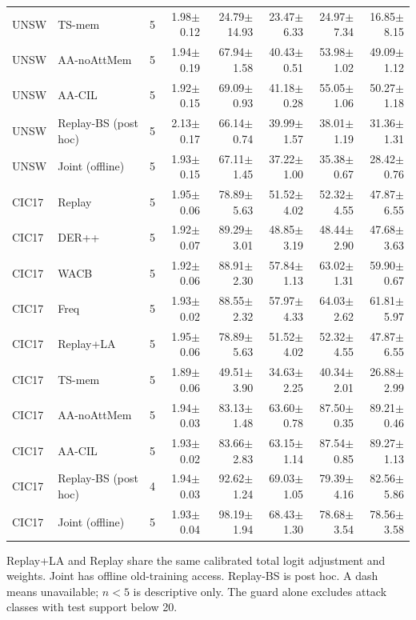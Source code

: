 \begin{table}[t]
\begin{tabular}{llrrrrrr}
UNSW & TS-mem & 5 & 1.98$\pm$0.12 & 24.79$\pm$14.93 & 23.47$\pm$6.33 & 24.97$\pm$7.34 & 16.85$\pm$8.15 \\
UNSW & AA-noAttMem & 5 & 1.94$\pm$0.19 & 67.94$\pm$1.58 & 40.43$\pm$0.51 & 53.98$\pm$1.02 & 49.09$\pm$1.12 \\
UNSW & AA-CIL & 5 & 1.92$\pm$0.15 & 69.09$\pm$0.93 & 41.18$\pm$0.28 & 55.05$\pm$1.06 & 50.27$\pm$1.18 \\
UNSW & Replay-BS (post hoc) & 5 & 2.13$\pm$0.17 & 66.14$\pm$0.74 & 39.99$\pm$1.57 & 38.01$\pm$1.19 & 31.36$\pm$1.31 \\
UNSW & Joint (offline) & 5 & 1.93$\pm$0.15 & 67.11$\pm$1.45 & 37.22$\pm$1.00 & 35.38$\pm$0.67 & 28.42$\pm$0.76 \\
CIC17 & Replay & 5 & 1.95$\pm$0.06 & 78.89$\pm$5.63 & 51.52$\pm$4.02 & 52.32$\pm$4.55 & 47.87$\pm$6.55 \\
CIC17 & DER++ & 5 & 1.92$\pm$0.07 & 89.29$\pm$3.01 & 48.85$\pm$3.19 & 48.44$\pm$2.90 & 47.68$\pm$3.63 \\
CIC17 & WACB & 5 & 1.92$\pm$0.06 & 88.91$\pm$2.30 & 57.84$\pm$1.13 & 63.02$\pm$1.31 & 59.90$\pm$0.67 \\
CIC17 & Freq & 5 & 1.93$\pm$0.02 & 88.55$\pm$2.32 & 57.97$\pm$4.33 & 64.03$\pm$2.62 & 61.81$\pm$5.97 \\
CIC17 & Replay+LA & 5 & 1.95$\pm$0.06 & 78.89$\pm$5.63 & 51.52$\pm$4.02 & 52.32$\pm$4.55 & 47.87$\pm$6.55 \\
CIC17 & TS-mem & 5 & 1.89$\pm$0.06 & 49.51$\pm$3.90 & 34.63$\pm$2.25 & 40.34$\pm$2.01 & 26.88$\pm$2.99 \\
CIC17 & AA-noAttMem & 5 & 1.94$\pm$0.03 & 83.13$\pm$1.48 & 63.60$\pm$0.78 & 87.50$\pm$0.35 & 89.21$\pm$0.46 \\
CIC17 & AA-CIL & 5 & 1.93$\pm$0.02 & 83.66$\pm$2.83 & 63.15$\pm$1.14 & 87.54$\pm$0.85 & 89.27$\pm$1.13 \\
CIC17 & Replay-BS (post hoc) & 4 & 1.94$\pm$0.03 & 92.62$\pm$1.24 & 69.03$\pm$1.05 & 79.39$\pm$4.16 & 82.56$\pm$5.86 \\
CIC17 & Joint (offline) & 5 & 1.93$\pm$0.04 & 98.19$\pm$1.94 & 68.43$\pm$1.30 & 78.68$\pm$3.54 & 78.56$\pm$3.58 \\
\bottomrule
\end{tabular}
\par\vspace{2pt}\begin{minipage}{.98\linewidth}\footnotesize Replay+LA and Replay share the same calibrated total logit adjustment and weights. Joint has offline old-training access. Replay-BS is post hoc. A dash means unavailable; $n<5$ is descriptive only. The guard alone excludes attack classes with test support below 20.\end{minipage}
\end{table}
